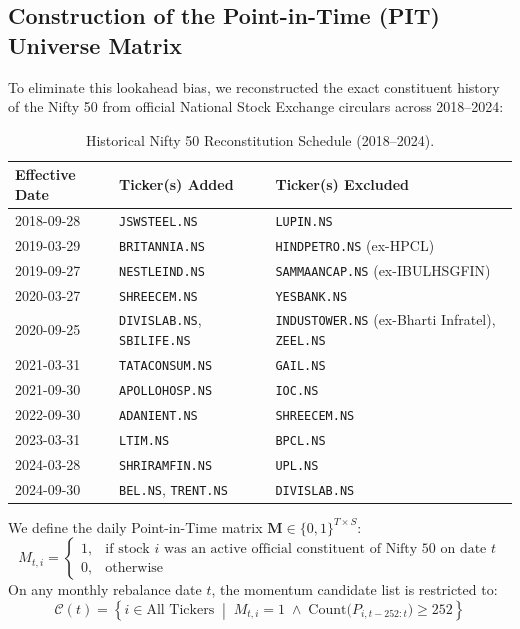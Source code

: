 \documentclass[11pt,a4paper]{article}
\begin{document}
\subsection{Construction of the Point-in-Time (PIT) Universe Matrix}
To eliminate this lookahead bias, we reconstructed the exact constituent history of the Nifty 50 from official National Stock Exchange circulars across 2018--2024:
\begin{table}[H]
\centering
\small
\begin{tabularx}{\textwidth}{llX}
\toprule
\textbf{Effective Date} & \textbf{Ticker(s) Added} & \textbf{Ticker(s) Excluded} \\
\midrule
2018-09-28 & \texttt{JSWSTEEL.NS} & \texttt{LUPIN.NS} \\
2019-03-29 & \texttt{BRITANNIA.NS} & \texttt{HINDPETRO.NS} (ex-HPCL) \\
2019-09-27 & \texttt{NESTLEIND.NS} & \texttt{SAMMAANCAP.NS} (ex-IBULHSGFIN) \\
2020-03-27 & \texttt{SHREECEM.NS} & \texttt{YESBANK.NS} \\
2020-09-25 & \texttt{DIVISLAB.NS}, \texttt{SBILIFE.NS} & \texttt{INDUSTOWER.NS} (ex-Bharti Infratel), \texttt{ZEEL.NS} \\
2021-03-31 & \texttt{TATACONSUM.NS} & \texttt{GAIL.NS} \\
2021-09-30 & \texttt{APOLLOHOSP.NS} & \texttt{IOC.NS} \\
2022-09-30 & \texttt{ADANIENT.NS} & \texttt{SHREECEM.NS} \\
2023-03-31 & \texttt{LTIM.NS} & \texttt{BPCL.NS} \\
2024-03-28 & \texttt{SHRIRAMFIN.NS} & \texttt{UPL.NS} \\
2024-09-30 & \texttt{BEL.NS}, \texttt{TRENT.NS} & \texttt{DIVISLAB.NS} \\
\bottomrule
\end{tabularx}
\caption{Historical Nifty 50 Reconstitution Schedule (2018--2024).}
\end{table}

We define the daily Point-in-Time matrix $\mathbf{M} \in \{0, 1\}^{T \times S}$:
\begin{equation}
M_{t, i} = 
\begin{cases}
1, & \text{if stock } i \text{ was an active official constituent of Nifty 50 on date } t \\
0, & \text{otherwise}
\end{cases}
\end{equation}
On any monthly rebalance date $t$, the momentum candidate list is restricted to:
\begin{equation}
\mathcal{C}(t) = \left\{ i \in \text{All Tickers} \;\middle|\; M_{t, i} = 1 \;\land\; \text{Count}\big(P_{i, t-252:t}\big) \ge 252 \right\}
\end{equation}
\end{document}
